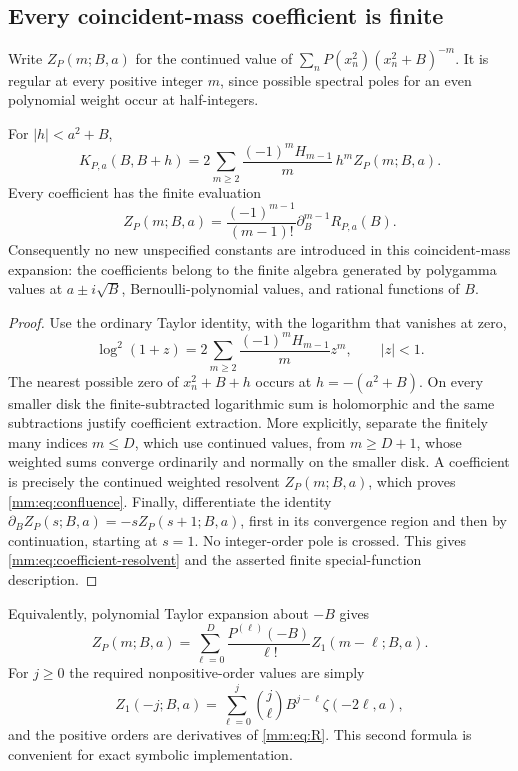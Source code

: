 \subsection{Every coincident-mass coefficient is finite}

Write $Z_{P}(m;B,a)$ for the continued value of
$\sum_nP(x_n^2)(x_n^2+B)^{-m}$.  It is regular at every positive
integer $m$, since possible spectral poles for an even polynomial
weight occur at half-integers.

\begin{theorem}
\label{mm:thm:confluence}
For $|h|<a^2+B$,
\begin{equation}\label{mm:eq:confluence}
 \boxed{\displaystyle
 K_{P,a}(B,B+h)=2\sum_{m\ge2}
       \frac{(-1)^mH_{m-1}}m\,h^m Z_{P}(m;B,a).}
\end{equation}
Every coefficient has the finite evaluation
\begin{equation}\label{mm:eq:coefficient-resolvent}
 Z_{P}(m;B,a)=\frac{(-1)^{m-1}}{(m-1)!}
                            \partial_B^{m-1}R_{P,a}(B).
\end{equation}
Consequently no new unspecified constants are introduced in this
coincident-mass expansion: the coefficients belong to the finite
algebra generated by polygamma values at $a\pm i\sqrt B$,
Bernoulli-polynomial values, and rational functions of $B$.
\end{theorem}
\begin{proof}
Use the ordinary Taylor identity, with the logarithm that vanishes at zero,
\[
 \log^2(1+z)=2\sum_{m\ge2}\frac{(-1)^mH_{m-1}}m z^m,
 \qquad |z|<1.
\]
The nearest possible zero of $x_n^2+B+h$ occurs at
$h=-(a^2+B)$.  On every smaller disk the finite-subtracted logarithmic
sum is holomorphic and the same subtractions justify coefficient
extraction.  More explicitly, separate the finitely many indices
$m\le D$, which use continued values, from $m\ge D+1$,
whose weighted sums converge ordinarily and normally on the smaller
disk.  A coefficient is precisely the continued weighted
resolvent $Z_P(m;B,a)$, which proves \eqref{mm:eq:confluence}.
Finally, differentiate the identity
$\partial_B Z_P(s;B,a)=-sZ_P(s+1;B,a)$, first in its convergence
region and then by continuation, starting at $s=1$.  No integer-order
pole is crossed.  This gives \eqref{mm:eq:coefficient-resolvent} and
the asserted finite special-function description.
\end{proof}

Equivalently, polynomial Taylor expansion about $-B$ gives
\[
 Z_P(m;B,a)=\sum_{\ell=0}^{D}\frac{P^{(\ell)}(-B)}{\ell!}
                          Z_1(m-\ell;B,a).
\]
For $j\ge0$ the required nonpositive-order values are simply
\[
 Z_1(-j;B,a)=\sum_{\ell=0}^{j}\binom j\ell
                              B^{j-\ell}\zeta(-2\ell,a),
\]
and the positive orders are derivatives of \eqref{mm:eq:R}.
This second formula is convenient for exact symbolic implementation.

